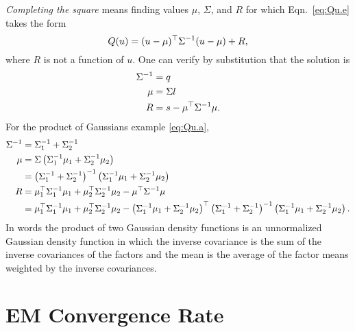 \emph{Completing the square} means finding values $\mu$, $\Sigma$, and
$R$ for which Eqn.~\eqref{eq:Qu.e} takes the form
\begin{equation}
  \label{eq:Qu.f}
  Q(u) = (u - \mu)^\top \Sigma^{-1} (u - \mu) + R,
\end{equation}
where $R$ is not a function of $u$.  One can verify by substitution
that the solution is
\begin{align*}
  \Sigma^{-1} &= q\\
  \mu &= \Sigma l\\
  R &= s -  \mu^\top \Sigma^{-1} \mu.
\end{align*}
For the product of Gaussians example \eqref{eq:Qu.a},
\begin{subequations}
  \label{eq:GaussianProduct}
  \begin{align}
  \Sigma^{-1} &= \Sigma_1^{-1} + \Sigma_2^{-1} \\
  \mu &= \Sigma \left( \Sigma_1^{-1} \mu_1 + \Sigma_2^{-1} \mu_2
  \right) \\
  &= \left( \Sigma_1^{-1} + \Sigma_2^{-1} \right)^{-1} \left(
  \Sigma_1^{-1} \mu_1 + \Sigma_2^{-1} \mu_2  \right) \\
  R &= \mu_1^\top \Sigma_1^{-1} \mu_1 + \mu_2^\top
  \Sigma_2^{-1} \mu_2 -  \mu^\top \Sigma^{-1} \mu \\
  &= \mu_1^\top \Sigma_1^{-1} \mu_1 + \mu_2^\top
  \Sigma_2^{-1} \mu_2 - \left( \Sigma_1^{-1} \mu_1 + \Sigma_2^{-1}
  \mu_2  \right) ^\top \left( \Sigma_1^{-1} + \Sigma_2^{-1}
  \right)^{-1} \left( \Sigma_1^{-1} \mu_1 + \Sigma_2^{-1} \mu_2
  \right).
\end{align}
\end{subequations}
In words the product of two Gaussian density functions is an
unnormalized Gaussian density function in which the inverse covariance
is the sum of the inverse covariances of the factors and the mean is
the average of the factor means weighted by the inverse covariances.

\chapter{EM Convergence Rate}
\label{chap:em_appendix}

